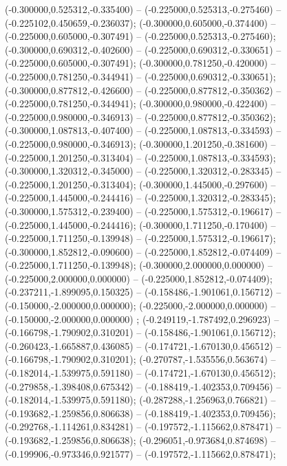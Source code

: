 (-0.300000,0.525312,-0.335400) -- (-0.225000,0.525313,-0.275460) -- (-0.225102,0.450659,-0.236037);
 (-0.300000,0.605000,-0.374400) -- (-0.225000,0.605000,-0.307491) -- (-0.225000,0.525313,-0.275460);
 (-0.300000,0.690312,-0.402600) -- (-0.225000,0.690312,-0.330651) -- (-0.225000,0.605000,-0.307491);
 (-0.300000,0.781250,-0.420000) -- (-0.225000,0.781250,-0.344941) -- (-0.225000,0.690312,-0.330651);
 (-0.300000,0.877812,-0.426600) -- (-0.225000,0.877812,-0.350362) -- (-0.225000,0.781250,-0.344941);
 (-0.300000,0.980000,-0.422400) -- (-0.225000,0.980000,-0.346913) -- (-0.225000,0.877812,-0.350362);
 (-0.300000,1.087813,-0.407400) -- (-0.225000,1.087813,-0.334593) -- (-0.225000,0.980000,-0.346913);
 (-0.300000,1.201250,-0.381600) -- (-0.225000,1.201250,-0.313404) -- (-0.225000,1.087813,-0.334593);
 (-0.300000,1.320312,-0.345000) -- (-0.225000,1.320312,-0.283345) -- (-0.225000,1.201250,-0.313404);
 (-0.300000,1.445000,-0.297600) -- (-0.225000,1.445000,-0.244416) -- (-0.225000,1.320312,-0.283345);
 (-0.300000,1.575312,-0.239400) -- (-0.225000,1.575312,-0.196617) -- (-0.225000,1.445000,-0.244416);
 (-0.300000,1.711250,-0.170400) -- (-0.225000,1.711250,-0.139948) -- (-0.225000,1.575312,-0.196617);
 (-0.300000,1.852812,-0.090600) -- (-0.225000,1.852812,-0.074409) -- (-0.225000,1.711250,-0.139948);
 (-0.300000,2.000000,0.000000) -- (-0.225000,2.000000,0.000000) -- (-0.225000,1.852812,-0.074409);
 (-0.237211,-1.899095,0.150325) -- (-0.158486,-1.901061,0.156712) -- (-0.150000,-2.000000,0.000000);
 (-0.225000,-2.000000,0.000000) -- (-0.150000,-2.000000,0.000000) ;
 (-0.249119,-1.787492,0.296923) -- (-0.166798,-1.790902,0.310201) -- (-0.158486,-1.901061,0.156712);
 (-0.260423,-1.665887,0.436085) -- (-0.174721,-1.670130,0.456512) -- (-0.166798,-1.790902,0.310201);
 (-0.270787,-1.535556,0.563674) -- (-0.182014,-1.539975,0.591180) -- (-0.174721,-1.670130,0.456512);
 (-0.279858,-1.398408,0.675342) -- (-0.188419,-1.402353,0.709456) -- (-0.182014,-1.539975,0.591180);
 (-0.287288,-1.256963,0.766821) -- (-0.193682,-1.259856,0.806638) -- (-0.188419,-1.402353,0.709456);
 (-0.292768,-1.114261,0.834281) -- (-0.197572,-1.115662,0.878471) -- (-0.193682,-1.259856,0.806638);
 (-0.296051,-0.973684,0.874698) -- (-0.199906,-0.973346,0.921577) -- (-0.197572,-1.115662,0.878471);
